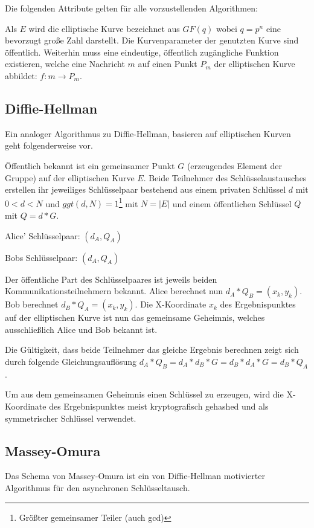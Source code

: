Die folgenden Attribute gelten für alle vorzustellenden Algorithmen:

Als $E$ wird die elliptische Kurve bezeichnet aus $GF(q)$ wobei $q = p^n$ eine bevorzugt große Zahl darstellt. 
Die Kurvenparameter der genutzten Kurve sind öffentlich.
Weiterhin muss eine eindeutige, öffentlich zugängliche Funktion existieren, welche eine Nachricht $m$ auf einen Punkt $P_m$ der 
elliptischen Kurve abbildet: $f:m \rightarrow P_m$.

\subsection{Diffie-Hellman}

Ein analoger Algorithmus zu Diffie-Hellman, basieren auf elliptischen Kurven geht folgenderweise vor.

Öffentlich bekannt ist ein gemeinsamer Punkt $G$ (erzeugendes Element der Gruppe) auf der elliptischen Kurve $E$.
Beide Teilnehmer des Schlüsselaustausches erstellen ihr jeweiliges Schlüsselpaar bestehend aus einem privaten Schlüssel
$d$ mit $0 < d < N$ und $ggt(d, N) = 1$\footnote{Größter gemeinsamer Teiler (auch gcd)} mit $N = |E|$ und einem öffentlichen 
Schlüssel $Q$ mit $Q = d * G$.

Alice' Schlüsselpaar: $(d_A, Q_A)$

Bobs Schlüsselpaar: $(d_A, Q_A)$

Der öffentliche Part des Schlüsselpaares ist jeweils beiden Kommunikationsteilnehmern bekannt.
Alice berechnet nun $d_A*Q_B = (x_k, y_k)$. Bob berechnet $d_B*Q_A = (x_k, y_k)$.
Die X-Koordinate $x_k$ des Ergebnispunktes auf der elliptischen Kurve ist nun das gemeinsame Geheimnis, welches
ausschließlich Alice und Bob bekannt ist.

Die Gültigkeit, dass beide Teilnehmer das gleiche Ergebnis berechnen zeigt sich durch folgende Gleichungsauflösung 
$d_A*Q_B = d_A*d_B*G = d_B*d_A*G = d_B*Q_A$.

Um aus dem gemeinsamen Geheimnis einen Schlüssel zu erzeugen, wird die X-Koordinate des Ergebnispunktes meist kryptografisch gehashed und
als symmetrischer Schlüssel verwendet.

\subsection{Massey-Omura}

Das Schema von Massey-Omura ist ein von Diffie-Hellman motivierter Algorithmus für den asynchronen Schlüsseltausch.

